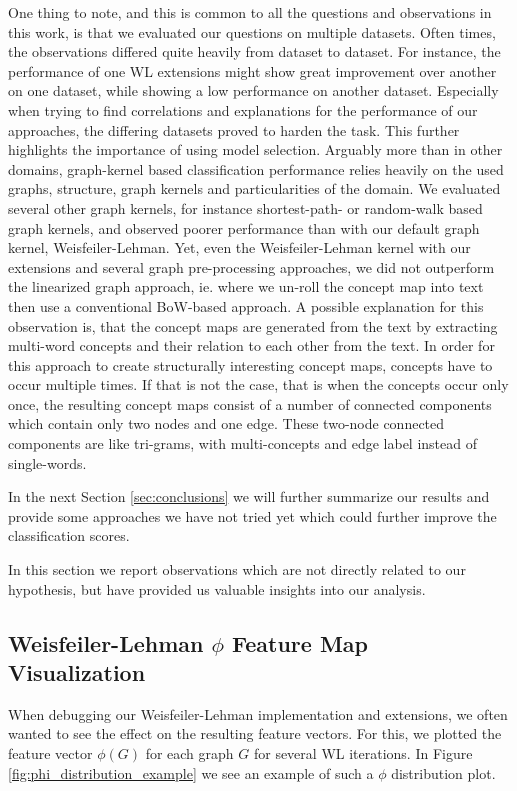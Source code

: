 One thing to note, and this is common to all the questions and observations in this work, is that we evaluated our questions on multiple datasets. Often times, the observations differed quite heavily from dataset to dataset.
For instance, the performance of one WL extensions might show great improvement over another on one dataset, while showing a low performance on another dataset. 
Especially when trying to find correlations and explanations for the performance of our approaches, the differing datasets proved to harden the task.
This further highlights the importance of using model selection.
Arguably more than in other domains,  graph-kernel based classification performance relies heavily on the used graphs, structure, graph kernels and particularities of the domain.
We evaluated several other graph kernels, for instance shortest-path- or random-walk based graph kernels, and observed poorer performance than with our default graph kernel, Weisfeiler-Lehman.
Yet, even the Weisfeiler-Lehman kernel with our extensions and several graph pre-processing approaches, we did not outperform the linearized graph approach, ie. where we un-roll the concept map into text then use a conventional BoW-based approach.
A possible explanation for this observation is, that the concept maps are generated from the text by extracting multi-word concepts and their relation to each other from the text.
In order for this approach to create structurally interesting concept maps, concepts have to occur multiple times.
If that is not the case, that is when the concepts occur only once, the resulting concept maps consist of a number of connected components which contain only two nodes and one edge.
These two-node connected components are like tri-grams, with multi-concepts and edge label instead of single-words.

In the next Section \ref{sec:conclusions} we will further summarize our results and provide some approaches we have not tried yet which could further improve the classification scores.

In this section we report observations which are not directly related to our hypothesis, but have provided us valuable insights into our analysis.

\subsection{Weisfeiler-Lehman $\phi$ Feature Map Visualization}
When debugging our Weisfeiler-Lehman implementation and extensions, we often wanted to see the effect on the resulting feature vectors.
For this, we plotted the feature vector $\phi(G)$ for each graph $G$ for several WL iterations.
In Figure \ref{fig:phi_distribution_example} we see an example of such a $\phi$ distribution plot.

